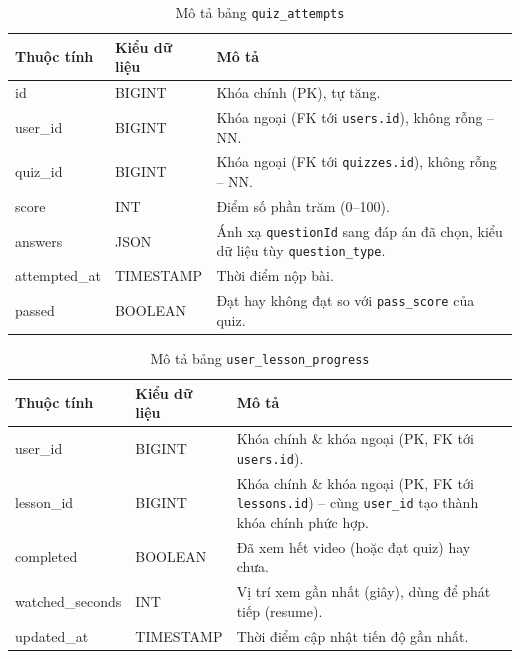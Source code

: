 \documentclass[../DoAn.tex]{subfiles}
\begin{document}
\begin{table}[H]
\centering
\small
\renewcommand{\arraystretch}{1.2}
\begin{tabular}{|p{3.2cm}|p{2.4cm}|p{8cm}|}
\hline
\textbf{Thuộc tính} & \textbf{Kiểu dữ liệu} & \textbf{Mô tả} \\ \hline
id & BIGINT & Khóa chính (PK), tự tăng. \\ \hline
user\_id & BIGINT & Khóa ngoại (FK tới \texttt{users.id}), không rỗng -- NN. \\ \hline
quiz\_id & BIGINT & Khóa ngoại (FK tới \texttt{quizzes.id}), không rỗng -- NN. \\ \hline
score & INT & Điểm số phần trăm (0--100). \\ \hline
answers & JSON & Ánh xạ \texttt{questionId} sang đáp án đã chọn, kiểu dữ liệu tùy \texttt{question\_type}. \\ \hline
attempted\_at & TIMESTAMP & Thời điểm nộp bài. \\ \hline
passed & BOOLEAN & Đạt hay không đạt so với \texttt{pass\_score} của quiz. \\ \hline
\end{tabular}
\renewcommand{\arraystretch}{1}
\caption{Mô tả bảng \texttt{quiz\_attempts}}
\label{table:db-quiz-attempts}
\end{table}

\begin{table}[H]
\centering
\small
\renewcommand{\arraystretch}{1.2}
\begin{tabular}{|p{3.2cm}|p{2.4cm}|p{8cm}|}
\hline
\textbf{Thuộc tính} & \textbf{Kiểu dữ liệu} & \textbf{Mô tả} \\ \hline
user\_id & BIGINT & Khóa chính \& khóa ngoại (PK, FK tới \texttt{users.id}). \\ \hline
lesson\_id & BIGINT & Khóa chính \& khóa ngoại (PK, FK tới \texttt{lessons.id}) -- cùng \texttt{user\_id} tạo thành khóa chính phức hợp. \\ \hline
completed & BOOLEAN & Đã xem hết video (hoặc đạt quiz) hay chưa. \\ \hline
watched\_seconds & INT & Vị trí xem gần nhất (giây), dùng để phát tiếp (resume). \\ \hline
updated\_at & TIMESTAMP & Thời điểm cập nhật tiến độ gần nhất. \\ \hline
\end{tabular}
\renewcommand{\arraystretch}{1}
\caption{Mô tả bảng \texttt{user\_lesson\_progress}}
\label{table:db-user-lesson-progress}
\end{table}
\end{document}
